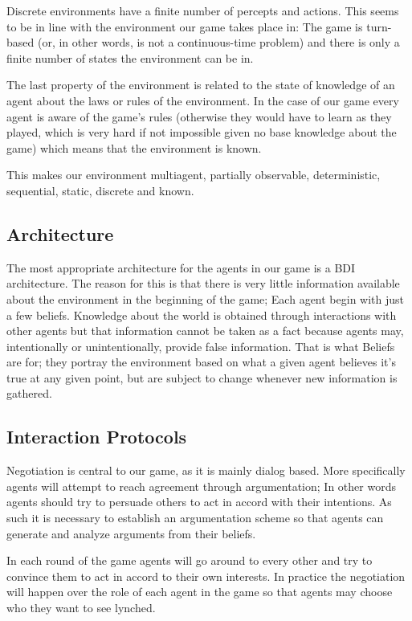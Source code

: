 \documentclass{article}
\begin{document}
Discrete environments have a finite number of percepts and actions. This seems to be in line with the environment our game takes place in: The game is turn-based (or, in other words, is not a continuous-time problem) and there is only a finite number of states the environment can be in. 

The last property of the environment is related to the state of knowledge of an agent about the laws or rules of the environment. In the case of our game every agent is aware of the game's rules (otherwise they would have to learn as they played, which is very hard if not impossible given no base knowledge about the game) which means that the environment is known.

This makes our environment multiagent, partially observable, deterministic, sequential, static, discrete and known.

\subsection{Architecture}

The most appropriate architecture for the agents in our game is a BDI architecture. The reason for this is that there is very little information available about the environment in the beginning of the game; Each agent begin with just a few beliefs. Knowledge about the world is obtained through interactions with other agents but that information cannot be taken as a fact because agents may, intentionally or unintentionally, provide false information. That is what Beliefs are for; they portray the environment based on what a given agent believes it's true at any given point, but are subject to change whenever new information is gathered.

\subsection{Interaction Protocols}

Negotiation is central to our game, as it is mainly dialog based. More specifically agents will attempt to reach agreement through argumentation; In other words agents should try to persuade others to act in accord with their intentions. As such it is necessary to establish an argumentation scheme so that agents can generate and analyze arguments from their beliefs.

In each round of the game agents will go around to every other and try to convince them to act in accord to their own interests. In practice the negotiation will happen over the role of each agent in the game so that agents may choose who they want to see lynched.
\end{document}
